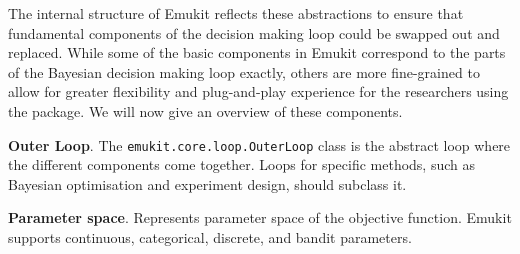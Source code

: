 
The internal structure of Emukit reflects these abstractions to ensure that fundamental components of the decision making loop could be swapped out and replaced. While some of the basic components in Emukit correspond to the parts of the Bayesian decision making loop exactly, others are more fine-grained to allow for greater flexibility and plug-and-play experience for the researchers using the package. We will now give an overview of these components.

\textbf{Outer Loop}. The \texttt{emukit.core.loop.OuterLoop} class is the abstract loop where the different components come together. Loops for specific methods, such as Bayesian optimisation and experiment design, should subclass it.

\textbf{Parameter space}. Represents parameter space of the objective function. Emukit supports continuous, categorical, discrete, and bandit parameters.

